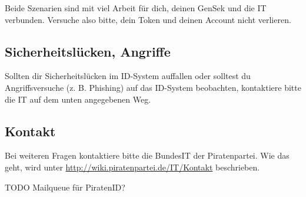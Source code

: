 \documentclass[parskip=half]{scrartcl}
\begin{document}
Beide Szenarien sind mit viel Arbeit für dich, deinen GenSek und die IT verbunden.
Versuche also bitte, dein Token und deinen Account nicht verlieren.

\subsection{Sicherheitslücken, Angriffe}
Sollten dir Sicherheitslücken im ID-System auffallen oder solltest du Angriffsversuche (z. B. Phishing) auf das ID-System beobachten,
kontaktiere bitte die IT auf dem unten angegebenen Weg.

\subsection{Kontakt}
Bei weiteren Fragen kontaktiere bitte die BundesIT der Piratenpartei.
Wie das geht, wird unter \url{http://wiki.piratenpartei.de/IT/Kontakt} beschrieben.

TODO Mailqueue für PiratenID?
\end{document}

